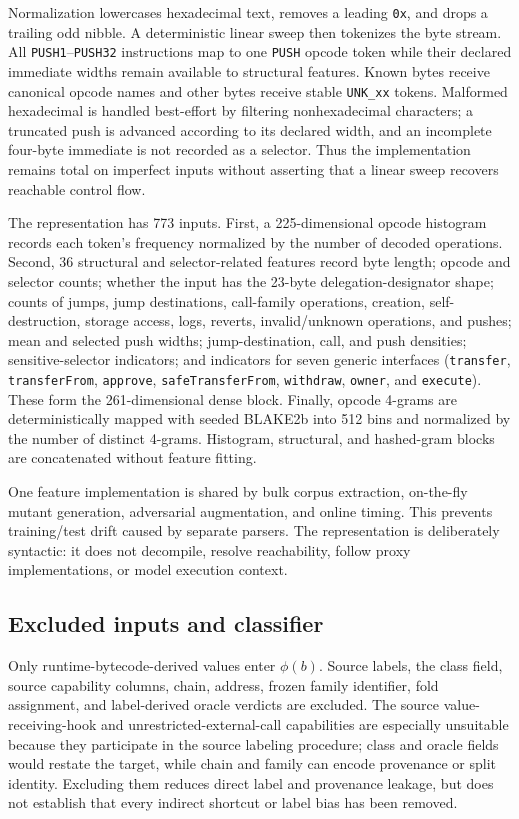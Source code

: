 Normalization lowercases hexadecimal text, removes a leading \texttt{0x}, and drops a trailing odd nibble. A deterministic linear sweep then tokenizes the byte stream. All \texttt{PUSH1}--\texttt{PUSH32} instructions map to one \texttt{PUSH} opcode token while their declared immediate widths remain available to structural features. Known bytes receive canonical opcode names and other bytes receive stable \texttt{UNK\_xx} tokens. Malformed hexadecimal is handled best-effort by filtering nonhexadecimal characters; a truncated push is advanced according to its declared width, and an incomplete four-byte immediate is not recorded as a selector. Thus the implementation remains total on imperfect inputs without asserting that a linear sweep recovers reachable control flow.

The representation has 773 inputs. First, a 225-dimensional opcode histogram records each token's frequency normalized by the number of decoded operations. Second, 36 structural and selector-related features record byte length; opcode and selector counts; whether the input has the 23-byte delegation-designator shape; counts of jumps, jump destinations, call-family operations, creation, self-destruction, storage access, logs, reverts, invalid/unknown operations, and pushes; mean and selected push widths; jump-destination, call, and push densities; sensitive-selector indicators; and indicators for seven generic interfaces (\texttt{transfer}, \texttt{transferFrom}, \texttt{approve}, \texttt{safeTransferFrom}, \texttt{withdraw}, \texttt{owner}, and \texttt{execute}). These form the 261-dimensional dense block. Finally, opcode 4-grams are deterministically mapped with seeded BLAKE2b into 512 bins and normalized by the number of distinct 4-grams. Histogram, structural, and hashed-gram blocks are concatenated without feature fitting.

One feature implementation is shared by bulk corpus extraction, on-the-fly mutant generation, adversarial augmentation, and online timing. This prevents training/test drift caused by separate parsers. The representation is deliberately syntactic: it does not decompile, resolve reachability, follow proxy implementations, or model execution context.

\subsection{Excluded inputs and classifier}

Only runtime-bytecode-derived values enter $\phi(b)$. Source labels, the class field, source capability columns, chain, address, frozen family identifier, fold assignment, and label-derived oracle verdicts are excluded. The source value-receiving-hook and unrestricted-external-call capabilities are especially unsuitable because they participate in the source labeling procedure; class and oracle fields would restate the target, while chain and family can encode provenance or split identity. Excluding them reduces direct label and provenance leakage, but does not establish that every indirect shortcut or label bias has been removed.


